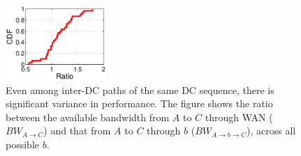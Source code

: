 
\begin{figure}[t]
\centering
\includegraphics[width=1.5in]{images/potential_v2.eps}%
\caption{Even among inter-DC paths of the same DC sequence,
there is significant variance in performance.
The figure shows the ratio between the available bandwidth
from $A$ to $C$ through WAN ($BW_{A\rightarrow C}$) and
that from $A$ to $C$ through $b$
($BW_{A\rightarrow b\rightarrow C}$),
across all possible $b$.}
\label{fig:case:size}
\vspace{-0.4cm}
\end{figure}

